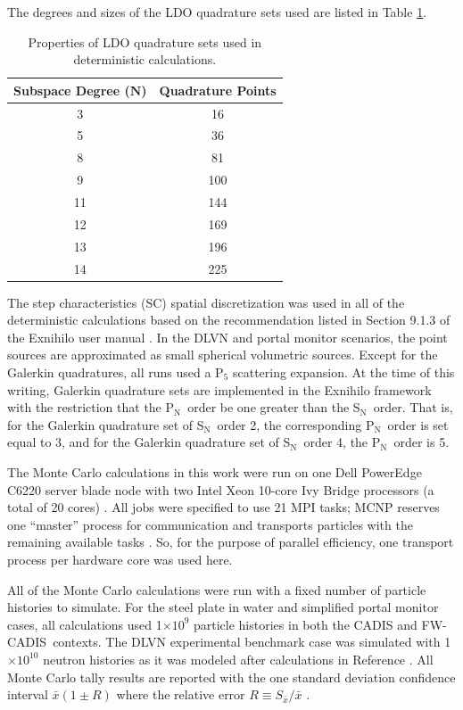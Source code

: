 \documentclass{article} %
\newcommand{\sn}{S$_\mathrm{N}$}
\newcommand{\pn}{P$_\mathrm{N}$}
\newcommand{\xbar}{\ensuremath{\bar{x}}}
\newcommand{\E}[1]{$\times10^{#1}$}
\newcommand{\fwc}{\mbox{FW-CADIS}}
\begin{document}
The degrees and sizes of the LDO quadrature sets used are listed in Table
\ref{ldo-n}.

\begin{table}[!htb]
\centering
\caption{Properties of LDO quadrature sets used in deterministic calculations.}
\begin{tabular}{cc}
\multicolumn{1}{l}{\textbf{Subspace Degree ($\mathbf{N}$)}} & 
\multicolumn{1}{l}{\textbf{Quadrature Points}} \\
\hline
3 & 16 \\
5 & 36 \\
8 & 81 \\
9 & 100 \\
11 & 144 \\
12 & 169 \\
13 & 196 \\
14 & 225 \\
\end{tabular}
\label{ldo-n}
\end{table}

The step characteristics (SC) spatial discretization was used in all of the
deterministic calculations based on the recommendation listed in Section 9.1.3
of the Exnihilo user manual \cite{exum}. In the DLVN and portal monitor
scenarios, the point sources are approximated as small spherical volumetric
sources. Except for the Galerkin quadratures, all runs used a P$_5$ scattering
expansion. At the time of this writing, Galerkin quadrature sets are
implemented in the Exnihilo framework with the restriction that the \pn\ order
be one greater than the \sn\ order. That is, for the Galerkin quadrature set of
\sn\ order 2, the corresponding \pn\ order is set equal to 3, and for the
Galerkin quadrature set of \sn\ order 4, the \pn\ order is 5.

The Monte Carlo calculations in this work were run on one Dell PowerEdge C6220
server blade node with two Intel Xeon 10-core Ivy Bridge processors (a total of
20 cores) \cite{savio}. All jobs were specified to use 21 MPI tasks; MCNP
reserves one ``master'' process for communication and transports particles with
the remaining available tasks \cite{mcnp}. So, for the purpose of parallel
efficiency, one transport process per hardware core was used here.

All of the Monte Carlo calculations were run with a fixed number of particle 
histories to simulate. For the steel plate in water and simplified portal 
monitor cases, all calculations used 1\E{9} particle histories in both the
CADIS and \fwc\ contexts. The DLVN experimental benchmark case was simulated 
with 1\E{10} neutron histories as it was modeled after calculations in
Reference \cite{sw-dlvn}. All Monte Carlo tally results are reported with the
one standard deviation confidence interval $\xbar(1\pm R)$ where the relative
error $R \equiv S_{\xbar}/\xbar$ \cite{mcnp}.
\end{document}
